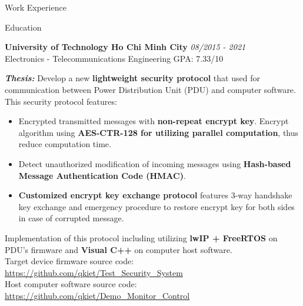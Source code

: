 \documentclass{resume} %
\begin{document}
\begin{rSection}{Work Experience}
\begin{rCompanySubsection}
\begin{itemize}
\end{itemize}
\end{rCompanySubsection}




\end{rSection}
\begin{rSection}{Education}

{\bf University of Technology Ho Chi Minh City} \hfill {\em 08/2015 - 2021} 
\\ Electronics - Telecommunications Engineering\hfill { GPA: 7.33/10 }


\textbf{\textit{Thesis:}} Develop a new \textbf{lightweight security protocol} that used for communication between Power Distribution Unit (PDU) and computer software. This security protocol features:
\begin{itemize}
    \item Encrypted transmitted messages with \textbf{non-repeat encrypt key}. Encrypt algorithm using \textbf{AES-CTR-128 for utilizing parallel computation}, thus reduce computation time.
    \item Detect unauthorized modification of incoming messages using \textbf{Hash-based Message Authentication Code (HMAC)}.
    \item \textbf{Customized encrypt key exchange protocol} features 3-way handshake key exchange and emergency procedure to restore encrypt key for both sides in case of corrupted message.
\end{itemize}
Implementation of this protocol including utilizing \textbf{lwIP + FreeRTOS} on PDU's firmware and \textbf{Visual C++} on computer host software.\\
Target device firmware source code: \href{https://github.com/qkiet/Test_Security_System}{https://github.com/qkiet/Test\_Security\_System}\\
Host computer software source code:
\href{https://github.com/qkiet/Demo_Monitor_Control}{https://github.com/qkiet/Demo\_Monitor\_Control}\


\end{rSection}
\end{document}
